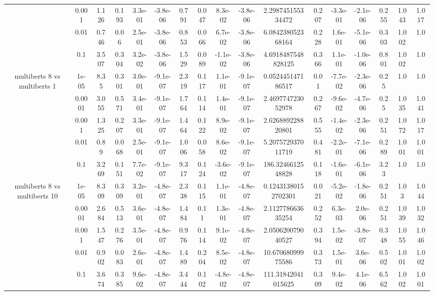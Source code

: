 \begin{tabular}{|c|c|c|c|c|c|c|c|c|c|c|c|c|c|c|c|c|}
 & 0.001 & 1.126 & 0.193 & 3.3e-01 & -3.8e-06 & 0.791 & 0.047 & 8.3e-02 & -3.8e-06 & 2.298745155334472 & 0.207 & -3.3e-01 & -2.1e-06 & 0.255 & 1.043 & 1.017 \\
 & 0.01 & 0.746 & 0.06 & 2.5e-01 & -3.8e-06 & 0.853 & 0.066 & 6.7e-02 & -3.8e-06 & 6.084238052368164 & 0.228 & 1.6e-01 & -5.1e-06 & 0.303 & 1.002 & 1.0 \\
 & 0.1 & 3.507 & 0.304 & 3.2e-02 & -3.8e-06 & 1.529 & 0.089 & -1.1e-02 & -3.8e-06 & 4.6918487548828125 & 0.366 & 1.1e-01 & -1.0e-06 & 0.801 & 1.002 & 1.0 \\
\hline
\multirow{5}{*}{multiberts 8 vs multiberts 1} & 1e-05 & 8.35 & 0.301 & 3.0e-01 & -9.1e-07 & 2.319 & 0.117 & 1.1e-01 & -9.1e-07 & 0.052445147186517 & 0.01 & -7.7e-02 & -2.3e-06 & 0.25 & 1.0 & 1.0 \\
 & 0.0001 & 3.055 & 0.571 & 3.4e-01 & -9.1e-07 & 1.764 & 0.114 & 1.4e-01 & -9.1e-07 & 2.469774723052978 & 0.267 & -9.6e-02 & -4.7e-06 & 0.25 & 1.035 & 1.041 \\
 & 0.001 & 1.325 & 0.207 & 3.3e-01 & -9.1e-07 & 1.464 & 0.122 & 8.9e-02 & -9.1e-07 & 2.626889228820801 & 0.555 & -1.4e-02 & -2.3e-06 & 0.251 & 1.072 & 1.017 \\
 & 0.01 & 0.89 & 0.068 & 2.5e-01 & -9.1e-07 & 1.006 & 0.058 & 8.6e-02 & -9.1e-07 & 5.207572937011719 & 0.481 & -2.2e-01 & -7.1e-06 & 0.289 & 1.001 & 1.001 \\
 & 0.1 & 3.269 & 0.151 & 7.7e-02 & -9.1e-07 & 9.317 & 0.124 & -3.6e-02 & -9.1e-07 & 186.3246612548828 & 0.118 & -1.6e-01 & -6.1e-06 & 3.23 & 1.0 & 1.0 \\
\hline
\multirow{5}{*}{multiberts 8 vs multiberts 10} & 1e-05 & 8.309 & 0.309 & 3.2e-01 & -4.8e-07 & 2.338 & 0.115 & 1.1e-01 & -4.8e-07 & 0.12431380152702301 & 0.021 & -5.2e-02 & -1.8e-06 & 0.251 & 1.03 & 1.044 \\
 & 0.0001 & 2.684 & 0.513 & 3.6e-01 & -4.8e-07 & 1.484 & 0.11 & 1.3e-01 & -4.8e-07 & 2.112778663635254 & 0.252 & 6.3e-03 & 2.0e-06 & 0.251 & 1.039 & 1.032 \\
 & 0.001 & 1.547 & 0.276 & 3.5e-01 & -4.8e-07 & 0.976 & 0.114 & 9.1e-02 & -4.8e-07 & 2.050620079040527 & 0.394 & 1.5e-02 & -3.8e-07 & 0.348 & 1.055 & 1.046 \\
 & 0.01 & 0.902 & 0.083 & 2.6e-01 & -4.8e-07 & 1.489 & 0.204 & 8.5e-02 & -4.8e-07 & 10.67068099975586 & 0.373 & 1.5e-01 & 3.6e-06 & 0.502 & 1.001 & 1.002 \\
 & 0.1 & 3.674 & 0.385 & 9.6e-02 & -4.8e-07 & 3.444 & 0.102 & -4.8e-02 & -4.8e-07 & 111.31842041015625 & 0.309 & 9.4e-02 & 4.1e-06 & 6.562 & 1.002 & 1.001 \\

\end{tabular}
